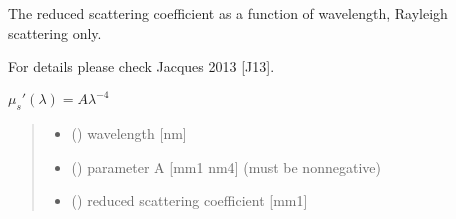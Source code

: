 \documentclass[letterpaper,10pt,english]{sphinxmanual}
\begin{document}

\begin{fulllineitems}
\label{\detokenize{04_scattering_coefficient:skinoptics.scattering_coefficient.rmus_Ray}}
\pysigstartsignatures
{}
\pysigstopsignatures
\begin{DUlineblock}{0em}
\item[] The reduced scattering coefficient as a function of wavelength, Rayleigh scattering only.
\item[] For details please check Jacques 2013 {[}J13{]}.
\end{DUlineblock}

\sphinxAtStartPar
\(\mu_s'(\lambda) = A \lambda^{-4}\)
\begin{quote}\begin{description}
\begin{itemize}
\item {} 
\sphinxAtStartPar
{} () \textendash{} wavelength {[}nm{]}

\item {} 
\sphinxAtStartPar
{} () \textendash{} parameter A {[}mm\sphinxhyphen{}1 nm4{]} (must be nonnegative)

\end{itemize}

\sphinxAtStartPar
\begin{itemize}
\item {} 
\sphinxAtStartPar
{} () \textendash{} reduced scattering coefficient {[}mm\sphinxhyphen{}1{]}

\end{itemize}


\end{description}\end{quote}

\end{fulllineitems}
\end{document}

